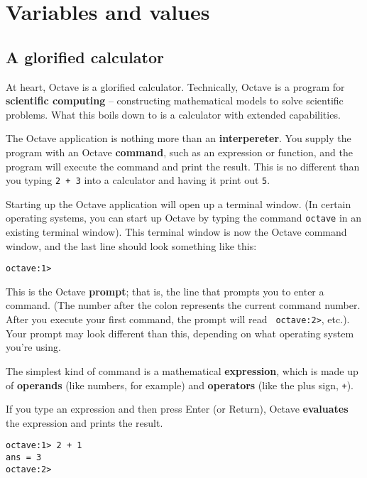 
\chapter{Variables and values}

\section{A glorified calculator}
\label{calc}

At heart, Octave is a glorified calculator. Technically, Octave is a
program for {\bf scientific computing} -- constructing mathematical models
to solve scientific problems.
What this boils down to is a calculator with extended capabilities.

The Octave application is nothing more than an {\bf interpereter}. You supply
the program with an Octave {\bf command}, such as an expression or function,
and the program will execute the command and print the result. This is no
different than you typing {\tt 2 + 3} into a calculator and having it print
out {\tt 5}.

Starting up the Octave application will open up a terminal window.
(In certain operating systems, you can start up Octave by typing the command
{\tt octave} in an existing terminal window). This terminal window is now the
Octave command window, and the last line should look something
like this:
%
\begin{verbatim}
octave:1>
\end{verbatim}
%
This is the Octave {\bf prompt}; that is, the line that prompts you to
enter a command. (The number after the colon represents the current
command
number. After you execute your first command, the prompt will read {\tt
octave:2>}, etc.). Your prompt may look different than this, depending on what
operating system you're using.

The simplest kind of command is a mathematical {\bf expression}, which
is made up of {\bf operands} (like numbers, for example) and
{\bf operators} (like the plus sign, {\tt +}).

If you type an expression and then press Enter (or Return), Octave
{\bf evaluates} the expression and prints the result.

\begin{verbatim}
octave:1> 2 + 1
ans = 3
octave:2>
\end{verbatim}

